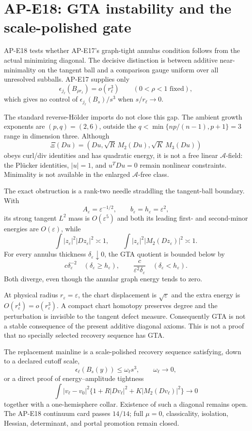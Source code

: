 \section{AP-E18: GTA instability and the scale-polished gate}

AP-E18 tests whether AP-E17's graph-tight annulus condition follows from the
actual minimizing diagonal.  The decisive distinction is between additive
near-minimality on the tangent ball and a comparison gauge uniform over all
unresolved subballs.  AP-E17 supplies only
\[
 \epsilon_{j_\ell}(B_{\rho r_\ell})=o(r_\ell^3)
 \qquad(0<\rho<1\text{ fixed}),
\]
which gives no control of
$\epsilon_{j_\ell}(B_s)/s^3$ when $s/r_\ell\to0$.

The standard reverse-H\"older imports do not close this gap.  The ambient
growth exponents are $(p,q)=(2,6)$, outside the
$q<\min\{np/(n-1),p+1\}=3$ range in dimension three.  Although
\[
 \Xi(Du)=(Du,\sqrt R\,M_2(Du),\sqrt K\,M_3(Du))
\]
obeys curl/div identities and has quadratic energy, it is not a free linear
$\mathscr A$-field: the Pl\"ucker identities, $|u|=1$, and $u^TDu=0$ remain
nonlinear constraints.  Minimality is not available in the enlarged
$\mathscr A$-free class.

The exact obstruction is a rank-two needle straddling the tangent-ball
boundary.  With
\[
 A_\varepsilon=\varepsilon^{-1/2},\qquad
 b_\varepsilon=h_\varepsilon=\varepsilon^2,
\]
its strong tangent $L^2$ mass is $O(\varepsilon^5)$ and both its leading
first- and second-minor energies are $O(\varepsilon)$, while
\[
 \int|z_\varepsilon|^2|Dz_\varepsilon|^2\asymp1,\qquad
 \int|z_\varepsilon|^2|M_2(Dz_\varepsilon)|^2\asymp1.
\]
For every annulus thickness $\delta_\varepsilon\downarrow0$, the GTA
quotient is bounded below by
\[
 c\delta_\varepsilon^{-2}\quad(\delta_\varepsilon\geq h_\varepsilon),
 \qquad
 \frac{c}{\varepsilon^2\delta_\varepsilon}
 \quad(\delta_\varepsilon<h_\varepsilon).
\]
Both diverge, even though the annular graph energy tends to zero.

At physical radius $r_\varepsilon=\varepsilon$, the chart displacement is
$\sqrt\varepsilon$ and the extra energy is
$O(r_\varepsilon^4)=o(r_\varepsilon^3)$.  A compact chart homotopy preserves
degree and the perturbation is invisible to the tangent defect measure.
Consequently GTA is not a stable consequence of the present additive
diagonal axioms.  This is not a proof that no specially selected recovery
sequence has GTA.

The replacement mainline is a scale-polished recovery sequence satisfying,
down to a declared cutoff scale,
\[
 \epsilon_\ell(B_s(y))\leq\omega_\ell s^3,
 \qquad\omega_\ell\to0,
\]
or a direct proof of energy--amplitude tightness
\[
 \int|v_\ell-v_0|^2
 \{1+R|Dv_\ell|^2+K|M_2(Dv_\ell)|^2\}\to0
\]
together with a one-hemisphere collar.  Existence of such a diagonal remains
open.  The AP-E18 continuum card passes $14/14$; full $\mu=0$, classicality,
isolation, Hessian, determinant, and portal promotion remain closed.
